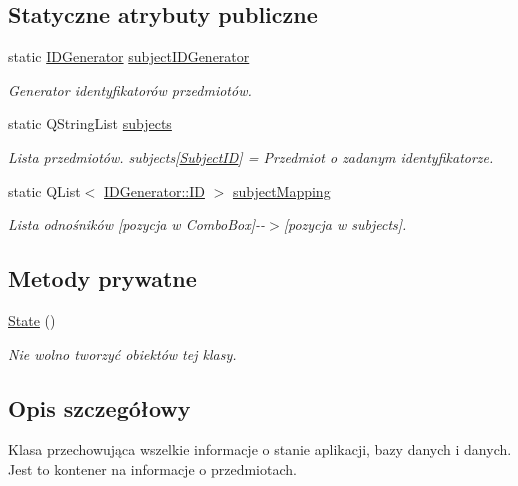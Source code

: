\subsection*{Statyczne atrybuty publiczne}
\begin{DoxyCompactItemize}
\item 
static \hyperlink{classIDGenerator}{IDGenerator} \hyperlink{classobsolete_1_1State_a79baf22dac86724b99d4b2b785e38875}{subjectIDGenerator}
\begin{DoxyCompactList}\small\item\em Generator identyfikatorów przedmiotów. \item\end{DoxyCompactList}\item 
static QStringList \hyperlink{classobsolete_1_1State_aeaa49570838d7cd7bb5585385df92b1c}{subjects}
\begin{DoxyCompactList}\small\item\em Lista przedmiotów. subjects\mbox{[}\hyperlink{classobsolete_1_1SubjectID}{SubjectID}\mbox{]} = Przedmiot o zadanym identyfikatorze. \item\end{DoxyCompactList}\item 
static QList$<$ \hyperlink{classIDGenerator_1_1ID}{IDGenerator::ID} $>$ \hyperlink{classobsolete_1_1State_acbed5e9ef96a7bf365f2429e1384bd03}{subjectMapping}
\begin{DoxyCompactList}\small\item\em Lista odnośników \mbox{[}pozycja w ComboBox\mbox{]}-\/-\/$>$\mbox{[}pozycja w subjects\mbox{]}. \item\end{DoxyCompactList}\end{DoxyCompactItemize}
\subsection*{Metody prywatne}
\begin{DoxyCompactItemize}
\item 
\hyperlink{classobsolete_1_1State_ac8dd10c3b5045899fc6095b1c79d27d1}{State} ()
\begin{DoxyCompactList}\small\item\em Nie wolno tworzyć obiektów tej klasy. \item\end{DoxyCompactList}\end{DoxyCompactItemize}


\subsection{Opis szczegółowy}
Klasa przechowująca wszelkie informacje o stanie aplikacji, bazy danych i danych. Jest to kontener na informacje o przedmiotach.

